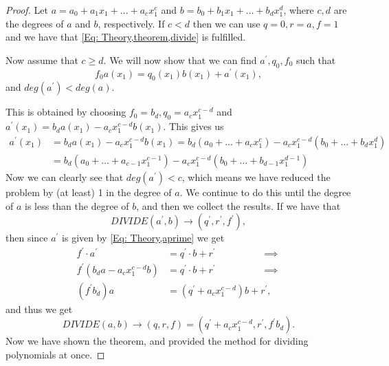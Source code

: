 \begin{proof}
  Let $a=a_0+a_1x_1+\ldots+a_cx_1^c$ and $b=b_0+b_1x_1+\ldots+b_dx_1^d$, where $c,d$ are the degrees of $a$ and $b$, respectively. If $c<d$ then we can use $q=0, r=a, f=1$ and we have that \ref{Eq: Theory,theorem,divide} is fulfilled.

  Now assume that $c\geq d$. We will now show that we can find $a^\prime,q_0,f_0$ such that
  \begin{equation}
    f_0a(x_1) = q_0(x_1)b(x_1) + a^\prime(x_1),
  \end{equation}
  and $deg(a^\prime) < deg(a)$.

  This is obtained by choosing $f_0=b_d, q_0=a_cx_1^{c-d}$ and $a^\prime(x_1)=b_da(x_1)-a_cx_1^{c-d}b(x_1)$. This gives us
  \begin{equation}\label{Eq: Theory,aprime}
    \begin{split}
      a^\prime(x_1) & = b_da(x_1)-a_cx_1^{c-d}b(x_1) = b_d(a_0+\ldots+a_cx_1^c)-a_cx_1^{c-d}(b_0+\ldots+b_dx_1^d) \\
      & = b_d(a_0+\ldots+a_{c-1}x_1^{c-1})-a_cx_1^{c-d}(b_0+\ldots+b_{d-1}x_1^{d-1})
    \end{split}
  \end{equation}
  Now we can clearly see that $deg(a^\prime)<c$, which means we have reduced the problem by (at least) 1 in the degree of $a$. We continue to do this until the degree of $a$ is less than the degree of $b$, and then we collect the results. If we have that
  \begin{equation}
    DIVIDE(a^\prime,b) \rightarrow (q^\prime,r^\prime,f^\prime),
  \end{equation}
  then since $a^\prime$ is given by \ref{Eq: Theory,aprime} we get
  \begin{equation}
    \begin{split}
      f^\prime\cdot a^\prime & =q^\prime\cdot b + r^\prime \hspace{2cm}\implies \\
      f^\prime (b_da-a_cx_1^{c-d}b) & =q^\prime\cdot b + r^\prime \hspace{2cm} \implies \\
      (f^\prime b_d)a & = (q^\prime + a_cx_1^{c-d})b + r^\prime,
    \end{split}
  \end{equation}
  and thus we get
  \begin{equation}
    DIVIDE(a,b) \rightarrow (q,r,f) = (q^\prime + a_cx_1^{c-d},r^\prime,f^\prime b_d).
  \end{equation}
  Now we have shown the theorem, and provided the method for dividing polynomials at once.
\end{proof}
